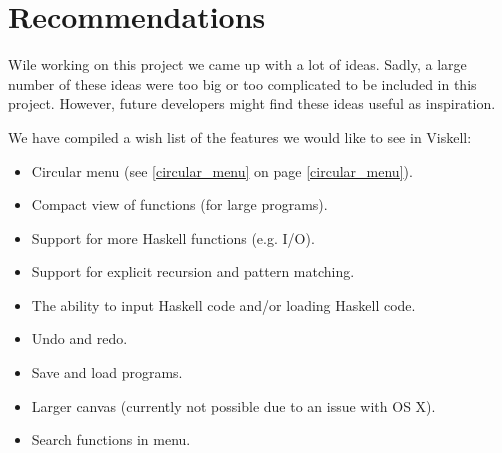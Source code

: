 \chapter{Recommendations}

Wile working on this project we came up with a lot of ideas.
Sadly, a large number of these ideas were too big or too complicated to be included in this project.
However, future developers might find these ideas useful as inspiration.

We have compiled a wish list of the features we would like to see in Viskell:

\begin{itemize}
	\item Circular menu (see \ref{circular_menu} on page \ref{circular_menu}).
	\item Compact view of functions (for large programs).
	\item Support for more Haskell functions (e.g. I/O).
	\item Support for explicit recursion and pattern matching.
	\item The ability to input Haskell code and/or loading Haskell code.
	\item Undo and redo.
	\item Save and load programs.
	\item Larger canvas (currently not possible due to an issue with OS X).
	\item Search functions in menu.
\end{itemize}

